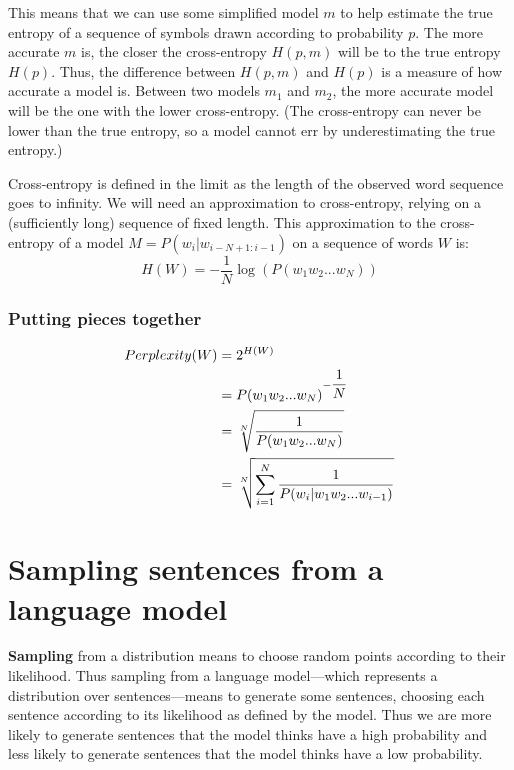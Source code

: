 This means that we can use some simplified model $m$ to help estimate the true entropy of a sequence of symbols drawn according to probability $p$. The more accurate $m$ is, the closer the cross-entropy $H(p,m)$ will be to the true entropy $H(p)$. Thus, the difference between $H(p,m)$ and $H(p)$ is a measure of how accurate a model is. Between two models $m_1$ and $m_2$, the more accurate model will be the one with the lower cross-entropy. (The cross-entropy can never be lower than the true entropy, so a model cannot err by underestimating the true entropy.)

Cross-entropy is defined in the limit as the length of the observed word sequence goes to infinity. We will need an approximation to cross-entropy, relying on a (sufficiently long) sequence of fixed length. This approximation to the cross-entropy of a model $M = P(w_i|w_{i-N+1:i-1})$ on a sequence of words $W$ is:
\[
    H(W) = -\displaystyle\frac{1}{N}\log(P(w_1w_2...w_N))
\]


\subsubsection{Putting pieces together}
\begin{align}
    Perplexity(W)       \notag
        &= 2^{H(W)}    \\ \notag
        &= P(w_1w_2...w_N)^{-\displaystyle\frac{1}{N}} \\ \notag
        &= \sqrt[N]{\displaystyle\frac{1}{P(w_1w_2...w_N)}} \\ \notag
        &= \sqrt[N]{\sum_{i=1}^{N} \displaystyle\frac{1}{P(w_i|w_1w_2...w_{i-1})}} \notag
\end{align}





\section{Sampling sentences from a language model \cite{nlp-1}}

\textbf{Sampling} from a distribution means to choose random points according to their likelihood. Thus sampling from a language model—which represents a distribution over sentences—means to generate some sentences, choosing each sentence according to its likelihood as defined by the model. Thus we are more likely to generate sentences that the model thinks have a high probability and less likely to generate sentences that the model thinks have a low probability.

